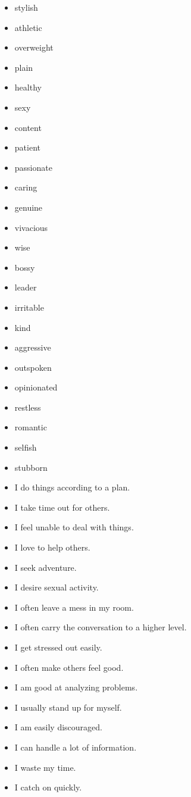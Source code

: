 \begin{appendices}
\begin{itemize}
\begin{enumerate}
\begin{itemize}
				\item stylish			
				\item athletic
				\item overweight
				\item plain
				\item healthy
				\item sexy
				\item content
				\item patient
				\item passionate
				\item caring
				\item genuine
				\item vivacious
				\item wise
				\item bossy
				\item leader
				\item irritable
				\item kind
				\item aggressive
				\item outspoken
				\item opinionated
				\item restless
				\item romantic
				\item selfish
				\item stubborn
				\item I do things according to a plan.
				\item I take time out for others.
				\item I feel unable to deal with things.
				\item I love to help others.
				\item I seek adventure.
				\item I desire sexual activity.
				\item I often leave a mess in my room.
				\item I often carry the conversation to a higher level.
				\item I get stressed out easily.
				\item I often make others feel good.
				\item I am good at analyzing problems.
				\item I usually stand up for myself.
				\item I am easily discouraged.
				\item I can handle a lot of information.
				\item I waste my time.
				\item I catch on quickly.

\end{itemize}
\end{enumerate}
\end{itemize}
\end{appendices}
